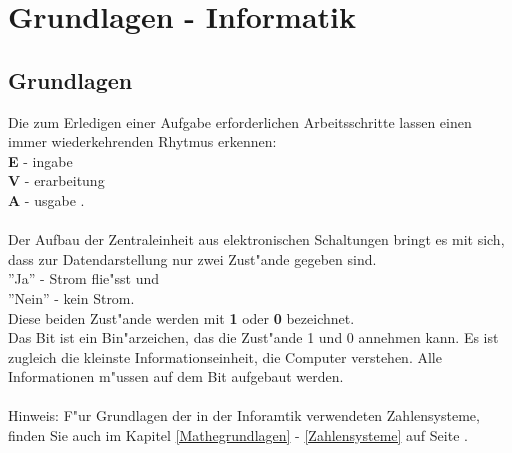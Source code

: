 \chapter{Grundlagen - Informatik}
\section{Grundlagen}
Die zum Erledigen einer Aufgabe erforderlichen Arbeitsschritte
lassen einen immer wiederkehrenden Rhytmus erkennen: \\
\textbf{E} - ingabe \\
\textbf{V} - erarbeitung \\
\textbf{A} - usgabe . \\
\\
Der Aufbau der Zentraleinheit aus elektronischen Schaltungen bringt
es mit sich, dass zur Datendarstellung nur zwei Zust"ande gegeben sind. \\
''Ja'' - Strom flie"sst und \\
''Nein'' - kein Strom. \\
Diese beiden Zust"ande werden mit \textbf{1} oder \textbf{0} bezeichnet.\\
Das Bit ist ein Bin"arzeichen, das die Zust"ande 1 und 0 annehmen kann.
Es ist zugleich die kleinste Informationseinheit, die Computer verstehen.
Alle Informationen m"ussen auf dem Bit aufgebaut werden.
\\
\\
Hinweis: F"ur Grundlagen der in der Inforamtik verwendeten Zahlensysteme,
finden Sie auch im Kapitel \ref{Mathegrundlagen} - \ref{Zahlensysteme}
auf Seite \pageref{Zahlensysteme} .


